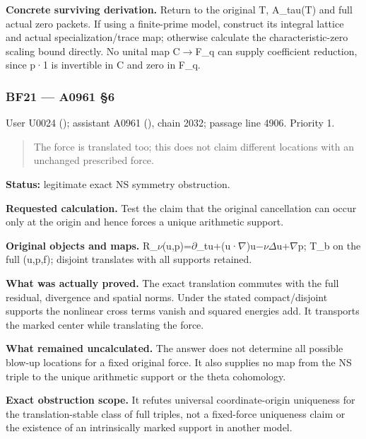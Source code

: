 \documentclass[10pt,a4paper,oneside]{report}
\begin{document}
\textbf{Concrete surviving derivation.} Return to the original T,
A\_tau(T) and full actual zero packets. If using a finite-prime model,
construct its integral lattice and actual specialization/trace map;
otherwise calculate the characteristic-zero scaling bound directly. No
unital map C\allowbreak{}\ensuremath{→}\allowbreak{}F\_q can supply
coefficient reduction, since p·1 is invertible in C and zero in F\_q.

\subsubsection{BF21 --- A0961 §6}\label{bf21-a0961-6}

User U0024 (\protect{});
assistant A0961 (\protect{}),
chain 2032; passage line 4906. Priority 1.

\begin{quote}
The force is translated too; this does not claim different locations
with an unchanged prescribed force.
\end{quote}

\textbf{Status:} legitimate exact NS symmetry obstruction.

\textbf{Requested calculation.} Test the claim that the original
cancellation can occur only at the origin and hence forces a unique
arithmetic support.

\textbf{Original objects and maps.}
R\_\allowbreak{}\ensuremath{ν}\allowbreak{}(u,p)=\allowbreak{}\ensuremath{∂}\allowbreak{}\_tu+(u·\allowbreak{}\ensuremath{∇}\allowbreak{})u\allowbreak{}\ensuremath{−}\allowbreak{}\allowbreak{}\ensuremath{ν}\allowbreak{}\allowbreak{}\ensuremath{Δ}\allowbreak{}u+\allowbreak{}\ensuremath{∇}\allowbreak{}p;
T\_b on the full (u,p,f); disjoint translates with all supports
retained.

\textbf{What was actually proved.} The exact translation commutes with
the full residual, divergence and spatial norms. Under the stated
compact/disjoint supports the nonlinear cross terms vanish and squared
energies add. It transports the marked center while translating the
force.

\textbf{What remained uncalculated.} The answer does not determine all
possible blow-up locations for a fixed original force. It also supplies
no map from the NS triple to the unique arithmetic support or the theta
cohomology.

\textbf{Exact obstruction scope.} It refutes universal coordinate-origin
uniqueness for the translation-stable class of full triples, not a
fixed-force uniqueness claim or the existence of an intrinsically marked
support in another model.
\end{document}

